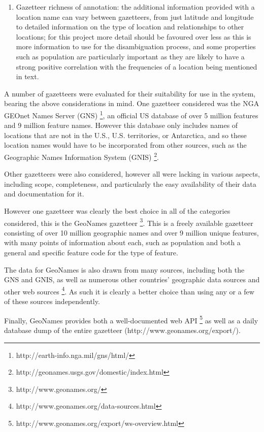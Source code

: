 \documentclass[12pt, a4paper]{report}
\begin{document}
\begin{enumerate}
{	}
	\item { Gazetteer richness of annotation: the additional information provided with a location name can vary between gazetteers, from just latitude and longitude to detailed information on the type of location and relationships to other locations; for this project more detail should be favoured over less as this is more information to use for the disambiguation process, and some properties such as population are particularly important as they are likely to have a strong positive correlation with the frequencies of a location being mentioned in text.
	}
	
\end{enumerate}


A number of gazetteers were evaluated for their suitability for use in the system, bearing the above considerations in mind. One gazetteer considered was the NGA GEOnet Names Server (GNS) \footnote{http://earth-info.nga.mil/gns/html/}, an official US database of over 5 million features and 9 million feature names. However this database only includes names of locations that are not in the U.S., U.S. territories, or Antarctica, and so these location names would have to be incorporated from other sources, such as the  Geographic Names Information System (GNIS) \footnote{http://geonames.usgs.gov/domestic/index.html}.

Other gazetteers were also considered, however all were lacking in various aspects, including scope, completeness, and particularly the easy availability of their data and documentation for it.

However one gazetteer was clearly the best choice in all of the categories considered, this is the GeoNames gazetteer \footnote{http://www.geonames.org/}. This is a freely available gazetteer consisting of over 10 million geographic names and over 9 million unique features, with many points of information about each, such as population and both a general and specific feature code for the type of feature.

The data for GeoNames is also drawn from many sources, including both the GNS and GNIS, as well as numerous other countries' geographic data sources and other web sources \footnote{http://www.geonames.org/data-sources.html}. As such it is clearly a better choice than using any or a few of these sources independently.

Finally, GeoNames provides both a well-documented web API \footnote{http://www.geonames.org/export/ws-overview.html} as well as a daily database dump of the entire gazetteer (http://www.geonames.org/export/).
\end{document}
